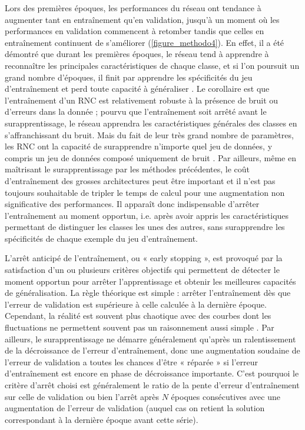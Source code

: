 Lors des premières époques, les performances du réseau ont tendance à augmenter tant en entraînement qu’en validation, jusqu’à un moment où les performances en validation commencent à retomber tandis que celles en entraînement continuent de s’améliorer (\autoref{figure_methodo4}). En effet, il a été démontré que durant les premières époques, le réseau tend à apprendre à reconnaître les principales caractéristiques de chaque classe, et si l’on poursuit un grand nombre d’époques, il finit par apprendre les spécificités du jeu d’entraînement et perd toute capacité à généraliser \citep{li_gradient_2019}. Le corollaire est que l’entraînement d’un RNC est relativement robuste à la présence de bruit ou d’erreurs dans la donnée ; pourvu que l’entraînement soit arrêté avant le surapprentissage, le réseau apprendra les caractéristiques générales des classes en s’affranchissant du bruit. Mais du fait de leur très grand nombre de paramètres, les RNC ont la capacité de surapprendre n’importe quel jeu de données, y compris un jeu de données composé uniquement de bruit \citep{zhang_understanding_2017}. Par ailleurs, même en maîtrisant le surapprentissage par les méthodes précédentes, le coût d’entraînement des grosses architectures peut être important et il n’est pas toujours souhaitable de tripler le temps de calcul pour une augmentation non significative des performances. Il apparaît donc indispensable d’arrêter l’entraînement au moment opportun, i.e. après avoir appris les caractéristiques permettant de distinguer les classes les unes des autres, sans surapprendre les spécificités de chaque exemple du jeu d’entraînement.

L’arrêt anticipé de l’entraînement, ou « early stopping », est provoqué par la satisfaction d’un ou plusieurs critères objectifs qui permettent de détecter le moment opportun pour arrêter l’apprentissage et obtenir les meilleures capacités de généralisation. La règle théorique est simple : arrêter l’entraînement dès que l’erreur de validation est supérieure à celle calculée à la dernière époque. Cependant, la réalité est souvent plus chaotique avec des courbes dont les fluctuations ne permettent souvent pas un raisonnement aussi simple \citep{prechelt_early_1998}. Par ailleurs, le surapprentissage ne démarre généralement qu’après un ralentissement de la décroissance de l’erreur d’entraînement, donc une augmentation soudaine de l’erreur de validation a toutes les chances d’être « réparée » si l’erreur d’entraînement est encore en phase de décroissance importante. C’est pourquoi le critère d’arrêt choisi est généralement le ratio de la pente d’erreur d’entraînement sur celle de validation ou bien l’arrêt après $N$ époques consécutives avec une augmentation de l’erreur de validation (auquel cas on retient la solution correspondant à la dernière époque avant cette série).

